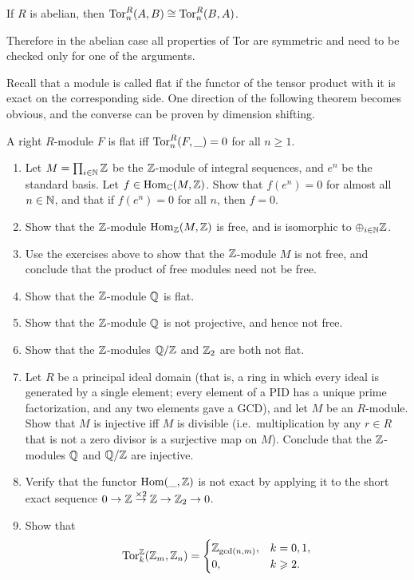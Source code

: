 \begin{cor}
    If $R$ is abelian, then $\operatorname{Tor}_n^R(A,B)\cong \operatorname{Tor}_n^R(B,A)$.
\end{cor}

Therefore in the abelian case all properties of Tor are symmetric and need to be checked only for one of the arguments.

Recall that a module is called flat if the functor of the tensor product with it is exact on the corresponding side.  One direction of the following theorem becomes obvious, and the converse can be proven by dimension shifting.

\begin{thm}
    A right $R$-module $F$ is flat iff $\operatorname{Tor}_n^R(F,\_)=0$ for all $n\geq 1$.
\end{thm}

\begin{xca}
    \begin{enumerate}
        \item Let $M=\prod_{i\in\mathbb{N}}\mathbb{Z}$ be the $\mathbb{Z}$-module of integral sequences, and $e^n$ be the standard basis. Let $f\in \operatorname{Hom}_{\mathbb{C}}(M,\mathbb{Z})$. Show that $f(e^n)=0$ for almost all $n\in \mathbb{N}$, and that if $f(e^n)=0$ for all $n$, then $f=0$.
        \item Show that the $\mathbb{Z}$-module $\operatorname{Hom}_{\mathbb{Z}}(M,\mathbb{Z})$ is free, and is isomorphic to $\oplus_{i\in \mathbb{N}}\mathbb{Z}$.
        \item Use the exercises above to show that the $\mathbb{Z}$-module $M$ is not free, and conclude that the product of free modules need not be free.
        \item Show that the $\mathbb{Z}$-module $\mathbb{Q}$ is flat.
        \item Show that the $\mathbb{Z}$-module $\mathbb{Q}$ is not projective, and hence not free.
        \item Show that the $\mathbb{Z}$-modules $\mathbb{Q}\slash\mathbb{Z}$ and $\mathbb{Z}_2$ are both not flat.
        \item Let $R$ be a principal ideal domain (that is, a ring in which every ideal is generated by a single element; every element of a PID has a unique prime factorization, and any two elements gave a GCD), and let $M$ be an $R$-module. Show that $M$ is injective iff $M$ is divisible (i.e.~multiplication by any $r\in R$ that is not a zero divisor is a surjective map on $M$). Conclude that the $\mathbb{Z}$-modules $\mathbb{Q}$ and $\mathbb{Q}\slash\mathbb{Z}$ are injective.
        \item Verify that the functor $\operatorname{Hom}(\_,\mathbb{Z})$ is not exact by applying it to the short exact sequence $0\to \mathbb{Z}\overset{\times 2}{\to}\mathbb{Z}\to \mathbb{Z}_2\to 0$.
        \item Show that 
            \[\operatorname{Tor}_k^{\mathbb{Z}}(\mathbb{Z}_m,\mathbb{Z}_n)=
                \begin{cases}
                \mathbb{Z}_{\gcd(n,m)},&k=0,1,\\
                0,& k\geqslant 2.
                \end{cases}
            \]
    \end{enumerate}
\end{xca}


